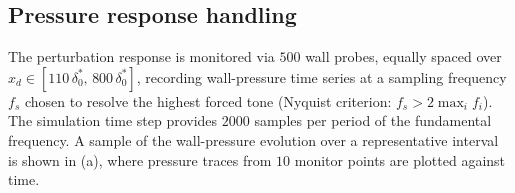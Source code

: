 





\subsection{Pressure response handling}
The perturbation response is monitored via $500$ wall probes, equally spaced over $x_d \in [110\,\delta^{*}_{0},\,800\,\delta^{*}_{0}]$, recording wall-pressure time series at a sampling frequency $f_s$ chosen to resolve the highest forced tone (Nyquist criterion: $f_s > 2\max_i f_i$). The simulation time step provides $2000$ samples per period of the fundamental frequency. A sample of the wall-pressure evolution over a representative interval is shown in (a), where pressure traces from $10$ monitor points are plotted against time.

